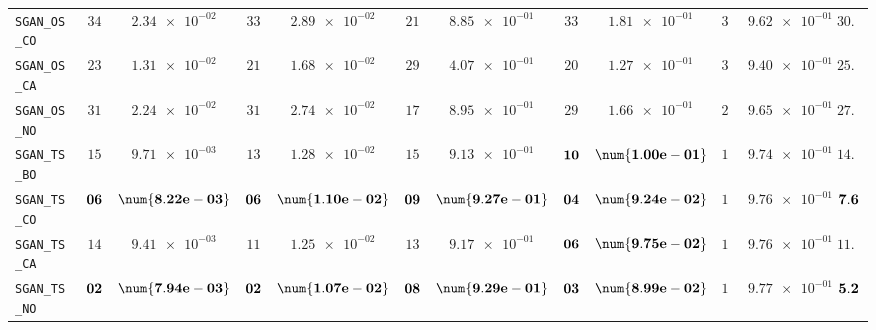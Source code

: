 \begin{table}[H]
\begin{tabularx}{\textwidth}{l||cC|cC|cC|cC|cC||c}
		\texttt{SGAN\_OS\_CO} & $ 34$ & $ \num{2.34e-02}$ & $ 33$ & $ \num{2.89e-02}$ & $ 21$ & $ \num{8.85e-01}$ & $ 33$ & $ \num{1.81e-01}$ & $ 30$ & $ \num{9.62e-01}$ & $ 30.2$  \\
		\texttt{SGAN\_OS\_CA} & $ 23$ & $ \num{1.31e-02}$ & $ 21$ & $ \num{1.68e-02}$ & $ 29$ & $ \num{4.07e-01}$ & $ 20$ & $ \num{1.27e-01}$ & $ 35$ & $ \num{9.40e-01}$ & $ 25.6$  \\
		\texttt{SGAN\_OS\_NO} & $ 31$ & $ \num{2.24e-02}$ & $ 31$ & $ \num{2.74e-02}$ & $ 17$ & $ \num{8.95e-01}$ & $ 29$ & $ \num{1.66e-01}$ & $ 28$ & $ \num{9.65e-01}$ & $ 27.2$  \\
		\texttt{SGAN\_TS\_BO} & $ 15$ & $ \num{9.71e-03}$ & $ 13$ & $ \num{1.28e-02}$ & $ 15$ & $ \num{9.13e-01}$ & $\bf 10$ & $\bf \num{1.00e-01}$ & $ 18$ & $ \num{9.74e-01}$ & $ 14.2$  \\
		\texttt{SGAN\_TS\_CO} & $\bf 06$ & $\bf \num{8.22e-03}$ & $\bf 06$ & $\bf \num{1.10e-02}$ & $\bf 09$ & $\bf \num{9.27e-01}$ & $\bf 04$ & $\bf \num{9.24e-02}$ & $ 13$ & $ \num{9.76e-01}$ & $\bf 7.6$  \\
		\texttt{SGAN\_TS\_CA} & $ 14$ & $ \num{9.41e-03}$ & $ 11$ & $ \num{1.25e-02}$ & $ 13$ & $ \num{9.17e-01}$ & $\bf 06$ & $\bf \num{9.75e-02}$ & $ 12$ & $ \num{9.76e-01}$ & $ 11.2$  \\
		\texttt{SGAN\_TS\_NO} & $\bf 02$ & $\bf \num{7.94e-03}$ & $\bf 02$ & $\bf \num{1.07e-02}$ & $\bf 08$ & $\bf \num{9.29e-01}$ & $\bf 03$ & $\bf \num{8.99e-02}$ & $ 11$ & $ \num{9.77e-01}$ & $\bf 5.2$  \\ \hline

\end{tabularx}
\end{table}
